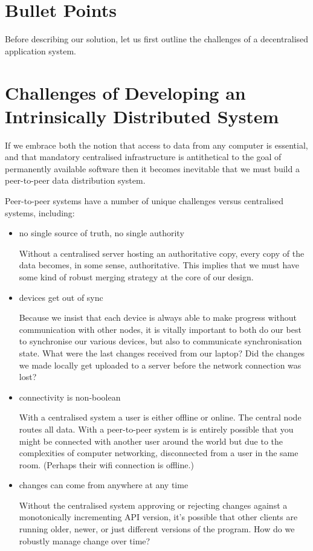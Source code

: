 \documentclass[sigplan,10pt]{acmart}
\begin{document}
\section{Bullet Points}

Before describing our solution, let us first outline the challenges of a decentralised application system.

\section{Challenges of Developing an Intrinsically Distributed System}

If we embrace both the notion that access to data from any computer is essential, and that mandatory centralised infrastructure is antithetical to the goal of permanently available software then it becomes inevitable that we must build a peer-to-peer data distribution system. 

Peer-to-peer systems have a number of unique challenges versus centralised systems, including:

\begin{itemize}
	\item no single source of truth, no single authority

	Without a centralised server hosting an authoritative copy, every copy of the data becomes, in some sense, authoritative. This implies that we must have some kind of robust merging strategy at the core of our design.
	\item devices get out of sync

    Because we insist that each device is always able to make progress without communication with other nodes, it is vitally important to both do our best to synchronise our various devices, but also to communicate synchronisation state. What were the last changes received from our laptop? Did the changes we made locally get uploaded to a server before the network connection was lost?  

    \item connectivity is non-boolean

    With a centralised system a user is either offline or online. The central node routes all data. With a peer-to-peer system is is entirely possible that you might be connected with another user around the world but due to the complexities of computer networking, disconnected from a user in the same room. (Perhaps their wifi connection is offline.) 

    \item changes can come from anywhere at any time

    Without the centralised system approving or rejecting changes against a monotonically incrementing API version, it's possible that other clients are running older, newer, or just different versions of the program. How do we robustly manage change over time?
\end{itemize}
\end{document}

